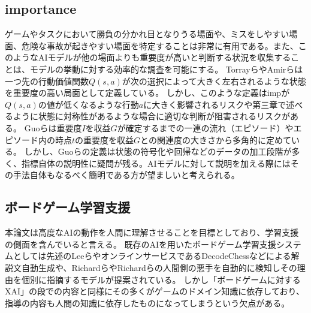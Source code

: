 \subsection{importance}
ゲームやタスクにおいて勝負の分かれ目となりうる場面や、ミスをしやすい場面、危険な事故が起きやすい場面を特定することは非常に有用である。また、このようなAIモデルが他の場面よりも重要度が高いと判断する状況を収集することは、モデルの挙動に対する効率的な調査を可能にする。
Torrayら\cite{imp2013}やAmirら\cite{imp2016}は一つ先の行動価値関数$Q(s, a)$が次の選択によって大きく左右されるような状態を重要度の高い局面として定義している。
しかし、このような定義はimpが$Q(s, a)$の値が低くなるような行動$a$に大きく影響されるリスクや第三章で述べるように状態に対称性があるような場合に適切な判断が阻害されるリスクがある。
Guoら\cite{EDGE}は重要度$I$を収益$G$が確定するまでの一連の流れ（エピソード）やエピソード内の時点$t$の重要度を収益$G$との関連度の大きさから多角的に定めている。
しかし、Guoらの定義は状態の符号化や回帰などのデータの加工段階が多く、指標自体の説明性に疑問が残る。AIモデルに対して説明を加える際にはその手法自体もなるべく簡明である方が望ましいと考えられる。





\subsection{ボードゲーム学習支援}
本論文は高度なAIの動作を人間に理解させることを目標としており、学習支援の側面を含んでいると言える。
既存のAIを用いたボードゲーム学習支援システムとしては先述のLeeら\cite{ChessComments}やオンラインサービスであるDecodeChess\cite{DecodeChess}などによる解説文自動生成や、Richard\cite{badMoves2016}らやRichard\cite{badMoves2017}らの人間側の悪手を自動的に検知しその理由を個別に指摘するモデルが提案されている。
しかし「ボードゲームに対するXAI」の段での内容と同様にその多くがゲームのドメイン知識に依存しており、指導の内容も人間の知識に依存したものになってしまうという欠点がある。



